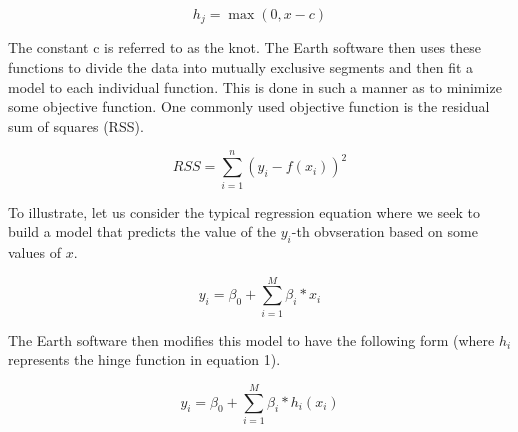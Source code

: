 \begin{equation}
h_{j}=\max (0,x-c)
\end{equation}

The constant c is referred to as the knot. The Earth software then uses these functions to divide the data into mutually exclusive segments and then fit a model to each individual function. This is done in such a manner as to minimize some objective function. One commonly used objective function is the residual sum of squares (RSS).

\begin{equation}
RSS=\sum_{i=1}^{n} (y_{i}-f(x_{i}))^{2}
\end{equation}

To illustrate, let us consider the typical regression equation where we seek to build a model that predicts the value of the $y_{i}$-th obvseration based on some values of $x$.

\begin{equation}
y_{i}=\beta _{0}+\sum_{i=1}^{M}\beta _{i}*x_{i}
\end{equation}

The Earth software then modifies this model to have the following form (where $h_{i}$ represents the hinge function in equation 1).

\begin{equation}
y_{i}=\beta _{0}+\sum_{i=1}^{M}\beta _{i}*h_{i}(x_{i})
\end{equation}

